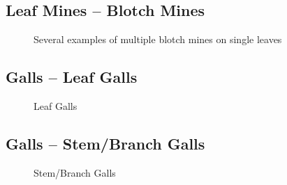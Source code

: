 \documentclass[
  letterpaper,
  oneside,
  open=any]{scrbook}
\begin{document}
\subsection{Leaf Mines -- Blotch Mines}\label{leaf-mines-blotch-mines}

\begin{figure}


\caption{\label{fig-mines2}Several examples of multiple blotch mines on
single leaves}

\end{figure}%

\subsection{Galls -- Leaf Galls}\label{galls-leaf-galls}

\begin{figure}


\caption{\label{fig-galls1}Leaf Galls}

\end{figure}%

\subsection{Galls -- Stem/Branch Galls}\label{galls-stembranch-galls}

\begin{figure}


\caption{\label{fig-galls2}Stem/Branch Galls}

\end{figure}%
\end{document}
